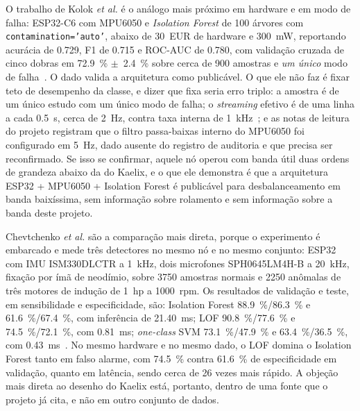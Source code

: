 \documentclass[11pt,a4paper]{article}
\begin{document}
O trabalho de Kolok \emph{et al.} é o análogo mais próximo em hardware e em modo de
falha: ESP32-C6 com MPU6050 e \emph{Isolation Forest} de \num{100} árvores com
\texttt{contamination='auto'}, abaixo de 30~EUR de hardware e \SI{300}{\milli\watt},
reportando acurácia de \num{0,729}, F1 de \num{0,715} e ROC-AUC de \num{0,780}, com
validação cruzada de cinco dobras em \SI{72,9}{\percent} $\pm$~\SI{2,4}{\percent} sobre
cerca de \num{900} amostras e \emph{um único} modo de falha~\cite{kolok2025}. O dado valida
a arquitetura como publicável. O que ele não faz é fixar teto de desempenho da classe, e
dizer que fixa seria erro triplo: a amostra é de um único estudo com um único modo de
falha; o \emph{streaming} efetivo é de uma linha a cada \SI{0,5}{\second}, cerca de
\SI{2}{\hertz}, contra taxa interna de \SI{1}{\kilo\hertz}~\cite{kolok2025}; e as notas de
leitura do projeto registram que o filtro passa-baixas interno do MPU6050 foi configurado
em \SI{5}{\hertz}, dado ausente do registro de auditoria e que precisa ser reconfirmado.
Se isso se confirmar, aquele nó operou com banda útil duas ordens de grandeza abaixo da do
Kaelix, e o que ele demonstra é que a arquitetura ESP32 + MPU6050 + Isolation Forest é
publicável para desbalanceamento em banda baixíssima, sem informação sobre rolamento e sem
informação sobre a banda deste projeto.

Chevtchenko \emph{et al.} são a comparação mais direta, porque o experimento é embarcado e
mede três detectores no mesmo nó e no mesmo conjunto: ESP32 com IMU ISM330DLCTR a
\SI{1}{\kilo\hertz}, dois microfones SPH0645LM4H-B a \SI{20}{\kilo\hertz}, fixação por ímã
de neodímio, sobre \num{3750} amostras normais e \num{2250} anômalas de três motores de
indução de 1~hp a \num{1000}~rpm. Os resultados de validação e teste, em sensibilidade e
especificidade, são: Isolation Forest \SI{88,9}{\percent}/\SI{86,3}{\percent} e
\SI{61,6}{\percent}/\SI{67,4}{\percent}, com inferência de \SI{21,40}{\milli\second}; LOF
\SI{90,8}{\percent}/\SI{77,6}{\percent} e \SI{74,5}{\percent}/\SI{72,1}{\percent}, com
\SI{0,81}{\milli\second}; \emph{one-class} SVM \SI{73,1}{\percent}/\SI{47,9}{\percent} e
\SI{63,4}{\percent}/\SI{36,5}{\percent}, com
\SI{0,43}{\milli\second}~\cite{chevtchenko2023}. No mesmo hardware e no mesmo dado, o LOF
domina o Isolation Forest tanto em falso alarme, com \SI{74,5}{\percent} contra
\SI{61,6}{\percent} de especificidade em validação, quanto em latência, sendo cerca de
\num{26} vezes mais rápido. A objeção mais direta ao desenho do Kaelix está, portanto,
dentro de uma fonte que o projeto já cita, e não em outro conjunto de dados.
\end{document}
